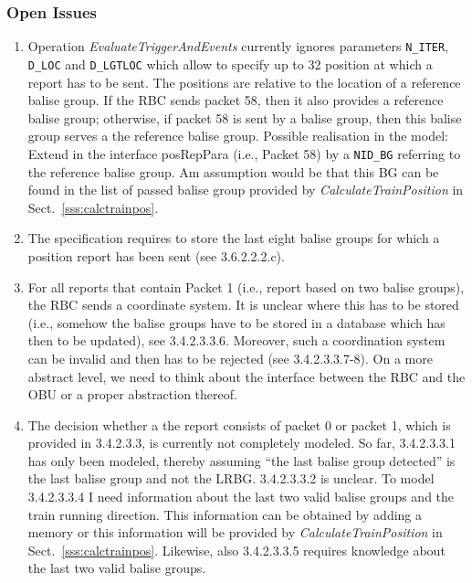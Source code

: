 \subsubsection{Open Issues}
\begin{enumerate}
	\item Operation \textit{EvaluateTriggerAndEvents} currently ignores parameters \verb+N_ITER+, \verb+D_LOC+ and \verb+D_LGTLOC+ which allow to specify up to 32 position at which a report has to be sent. The positions are relative to the location of a reference balise group. If the RBC sends packet 58, then it also provides a reference balise group; otherwise, if packet 58 is sent by a balise group, then this balise group serves a the reference balise group. Possible realisation in the model: Extend in the interface posRepPara (i.e., Packet 58) by a \verb+NID_BG+ referring to the reference balise group. Am assumption would be that this BG can be found in the list of passed balise group provided by \textit{CalculateTrainPosition} in Sect.~\ref{sss:calctrainpos}.
	\item The specification requires to store the last eight balise groups for which a position report has been sent (see 3.6.2.2.2.c).
	\item For all reports that contain Packet 1 (i.e., report based on two balise groups), the RBC sends a coordinate system. It is unclear where this has to be stored (i.e., somehow the balise groups have to be stored in a database which has then to be updated), see 3.4.2.3.3.6. Moreover, such a coordination system can be invalid and then has to be rejected (see 3.4.2.3.3.7-8). On a more abstract level, we need to think about the interface between the RBC and the OBU or a proper abstraction thereof.
	\item The decision whether a the report consists of packet 0 or packet 1, which is provided in 3.4.2.3.3, is currently not completely modeled. So far, 3.4.2.3.3.1 has only been modeled, thereby assuming ``the last balise group detected'' is the last balise group and not the LRBG. 3.4.2.3.3.2 is unclear. To model 3.4.2.3.3.4 I need information about the last two valid balise groups and the train running direction. This information can be obtained by adding a memory or this information will be provided by \textit{CalculateTrainPosition} in Sect.~\ref{sss:calctrainpos}. Likewise, also 3.4.2.3.3.5 requires knowledge about the last two valid balise groups.
\end{enumerate}
